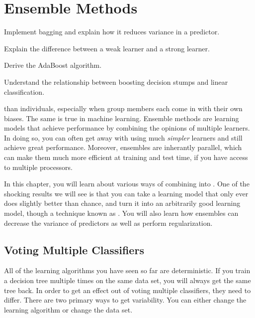 \chapter{Ensemble Methods} \label{sec:ens}

\chapterquote{}{}

\begin{learningobjectives}
\item Implement bagging and explain how it reduces variance in a
  predictor.
\item Explain the difference between a weak learner and a strong
  learner.
\item Derive the AdaBoost algorithm.
\item Understand the relationship between boosting decision stumps and
  linear classification.
\end{learningobjectives}

\dependencies{}

 than
individuals, especially when group members each come in with their own
biases.  The same is true in machine learning.  Ensemble methods are
learning models that achieve performance by combining the opinions of
multiple learners.  In doing so, you can often get away with using
much \emph{simpler} learners and still achieve great performance.
Moreover, ensembles are inherantly parallel, which can make them much
more efficient at training and test time, if you have access to
multiple processors.

In this chapter, you will learn about various ways of combining
 into
.  One of the shocking results we will
see is that you can take a learning model that only ever does slightly
better than chance, and turn it into an arbitrarily good learning
model, though a technique known as .  You will also
learn how ensembles can decrease the variance of predictors as well as
perform regularization.

\section{Voting Multiple Classifiers}

All of the learning algorithms you have seen so far are
deterministic.  If you train a decision tree multiple times on the
same data set, you will always get the same tree back.  In order to
get an effect out of voting multiple classifiers, they need to
differ.  There are two primary ways to get variability.  You can
either change the learning algorithm or change the data set.

